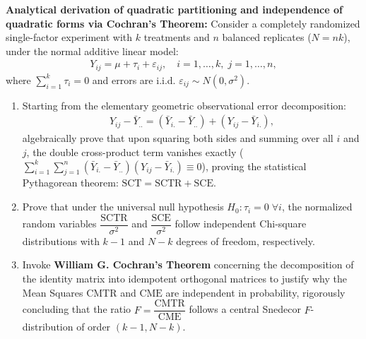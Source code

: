 \begin{problema}
	\label{prob:anova_desaf_cochran}
	\textbf{Analytical derivation of quadratic partitioning and independence of quadratic forms via Cochran's Theorem:}
	Consider a completely randomized single-factor experiment with $k$ treatments and $n$ balanced replicates ($N = nk$), under the normal additive linear model:
	\begin{align}
		Y_{ij} = \mu + \tau_i + \varepsilon_{ij}, \quad i=1, \dots, k, \; j=1, \dots, n,
	\end{align}
	where $\sum_{i=1}^k \tau_i = 0$ and errors are i.i.d. $\varepsilon_{ij} \sim N(0, \sigma^2)$.
	\begin{enumerate}
		\item Starting from the elementary geometric observational error decomposition:
		\begin{align}
			Y_{ij} - \bar{Y}_{..} = (\bar{Y}_{i.} - \bar{Y}_{..}) + (Y_{ij} - \bar{Y}_{i.}),
		\end{align}
		algebraically prove that upon squaring both sides and summing over all $i$ and $j$, the double cross-product term vanishes exactly ($\sum_{i=1}^k \sum_{j=1}^n (\bar{Y}_{i.} - \bar{Y}_{..})(Y_{ij} - \bar{Y}_{i.}) \equiv 0$), proving the statistical Pythagorean theorem: $\text{SCT} = \text{SCTR} + \text{SCE}$.
		\item Prove that under the universal null hypothesis $H_0: \tau_i = 0 \; \forall i$, the normalized random variables $\dfrac{\text{SCTR}}{\sigma^2}$ and $\dfrac{\text{SCE}}{\sigma^2}$ follow independent Chi-square distributions with $k-1$ and $N-k$ degrees of freedom, respectively.
		\item Invoke \textbf{William G. Cochran's Theorem} concerning the decomposition of the identity matrix into idempotent orthogonal matrices to justify why the Mean Squares $\text{CMTR}$ and $\text{CME}$ are independent in probability, rigorously concluding that the ratio $F = \dfrac{\text{CMTR}}{\text{CME}}$ follows a central Snedecor $F$-distribution of order $(k-1, N-k)$.
	\end{enumerate}
\end{problema}

